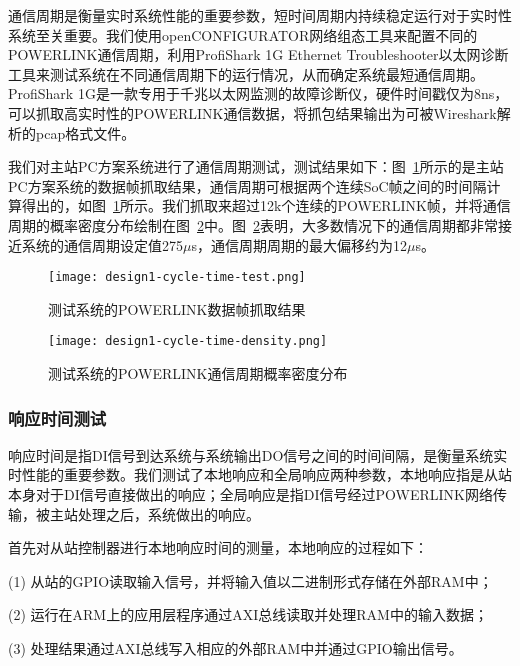 \label{subsection:主站PC方案系统通信周期测试}

通信周期是衡量实时系统性能的重要参数，短时间周期内持续稳定运行对于实时性系统至关重要。我们使用openCONFIGURATOR网络组态工具来配置不同的POWERLINK通信周期，利用ProfiShark 1G Ethernet Troubleshooter以太网诊断工具来测试系统在不同通信周期下的运行情况，从而确定系统最短通信周期。ProfiShark 1G是一款专用于千兆以太网监测的故障诊断仪，硬件时间戳仅为8ns，可以抓取高实时性的POWERLINK通信数据，将抓包结果输出为可被Wireshark解析的pcap格式文件。

我们对主站PC方案系统进行了通信周期测试，测试结果如下：图~\ref{fig:design1-cycle-time-test}所示的是主站PC方案系统的数据帧抓取结果，通信周期可根据两个连续SoC帧之间的时间隔计算得出的，如图~\ref{fig:design1-cycle-time-test}所示。我们抓取来超过12k个连续的POWERLINK帧，并将通信周期的概率密度分布绘制在图~\ref{fig:design1-cycle-time-density}中。图~\ref{fig:design1-cycle-time-density}表明，大多数情况下的通信周期都非常接近系统的通信周期设定值275$\mu$s，通信周期周期的最大偏移约为12$\mu$s。

\begin{figure}[!htb]
  \centering
  \texttt{[image: design1-cycle-time-test.png]}
  \caption{测试系统的POWERLINK数据帧抓取结果}
  \label{fig:design1-cycle-time-test}
\end{figure}

\begin{figure}[!htb]
  \centering
  \texttt{[image: design1-cycle-time-density.png]}
  \caption{测试系统的POWERLINK通信周期概率密度分布}
  \label{fig:design1-cycle-time-density}
\end{figure}


\subsubsection{响应时间测试}
响应时间是指DI信号到达系统与系统输出DO信号之间的时间间隔，是衡量系统实时性能的重要参数。我们测试了本地响应和全局响应两种参数，本地响应指是从站本身对于DI信号直接做出的响应；全局响应是指DI信号经过POWERLINK网络传输，被主站处理之后，系统做出的响应。

首先对从站控制器进行本地响应时间的测量，本地响应的过程如下：

(1) 从站的GPIO读取输入信号，并将输入值以二进制形式存储在外部RAM中；

(2) 运行在ARM上的应用层程序通过AXI总线读取并处理RAM中的输入数据；

(3) 处理结果通过AXI总线写入相应的外部RAM中并通过GPIO输出信号。

